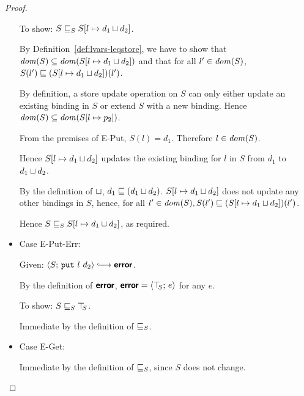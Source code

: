 \begin{proof}
\begin{itemize}
      To show: $S \sqsubseteq_S S[l \mapsto d_1 \sqcup d_2]$.

      By Definition~\ref{def:lvars-leqstore}, we have to show that
      $\mathit{dom}(S) \subseteq \mathit{dom}(S[l \mapsto d_1 \sqcup d_2])$ and
      that for all $l' \in \mathit{dom}(S)$, $S(l') \sqsubseteq
      (S[l \mapsto d_1 \sqcup d_2])(l')$.

      By definition, a store update operation on $S$ can only either
      update an existing binding in $S$ or extend $S$ with a new
      binding.  Hence $\mathit{dom}(S) \subseteq \mathit{dom}(S[l \mapsto p_2])$.

      From the premises of {\sc E-Put}, $S(l) = d_1$.  Therefore $l
      \in \mathit{dom}(S)$.

      Hence $S[l \mapsto d_1 \sqcup d_2]$ updates the existing
      binding for $l$ in $S$ from $d_1$ to $d_1 \sqcup d_2$.

      By the definition of $ \sqcup $, $d_1 \sqsubseteq
      (d_1 \sqcup d_2)$.  $S[l \mapsto d_1 \sqcup d_2]$
      does not update any other bindings in $S$, hence, for all $l'
      \in \mathit{dom}(S), S(l') \sqsubseteq
      (S[l \mapsto d_1 \sqcup d_2])(l')$.

      Hence $S \sqsubseteq_S S[l \mapsto d_1 \sqcup d_2]$, as
      required.

    \item Case {\sc E-Put-Err}:

      Given: $\config{S}{\putexp{l}{d_2}} \parstepsto \error$.

      By the definition of $\textbf{\textsf{error}}$, $\textbf{\textsf{error}} = \langle \top\hspace{-0.85mm}_{S};\, e \rangle$ for
      any $e$.

      To show: $S \sqsubseteq_S \top\hspace{-0.85mm}_{S}$.

      Immediate by the definition of $ \sqsubseteq_S $.

    \item Case {\sc E-Get}:

      Immediate by the definition of $ \sqsubseteq_S $, since $S$ does
      not change.

  \end{itemize}

\end{proof}
